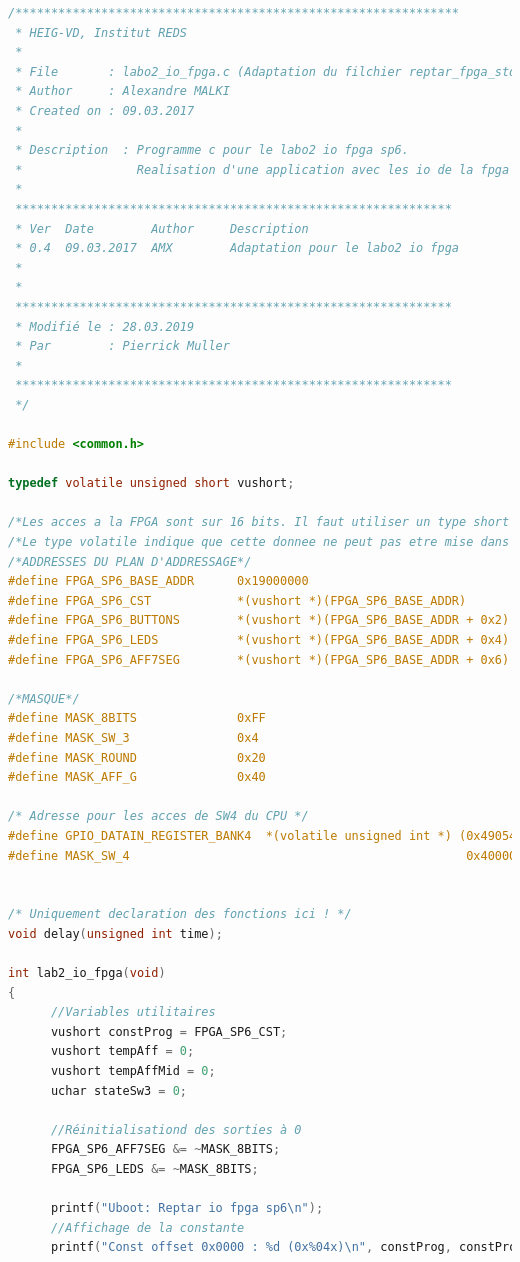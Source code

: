 \begin{lstlisting}[language=C]
/**************************************************************
 * HEIG-VD, Institut REDS
 *
 * File       : labo2_io_fpga.c (Adaptation du filchier reptar_fpga_std.c)
 * Author     : Alexandre MALKI
 * Created on : 09.03.2017
 *
 * Description  : Programme c pour le labo2 io fpga sp6.
 *                Realisation d'une application avec les io de la fpga
 *
 *************************************************************
 * Ver  Date        Author     Description
 * 0.4  09.03.2017  AMX        Adaptation pour le labo2 io fpga
 *
 *
 *************************************************************
 * Modifié le : 28.03.2019
 * Par        : Pierrick Muller
 *
 *************************************************************
 */

#include <common.h>

typedef volatile unsigned short vushort;

/*Les acces a la FPGA sont sur 16 bits. Il faut utiliser un type short */
/*Le type volatile indique que cette donnee ne peut pas etre mise dans le cash*/
/*ADDRESSES DU PLAN D'ADDRESSAGE*/
#define FPGA_SP6_BASE_ADDR      0x19000000
#define FPGA_SP6_CST            *(vushort *)(FPGA_SP6_BASE_ADDR)
#define FPGA_SP6_BUTTONS        *(vushort *)(FPGA_SP6_BASE_ADDR + 0x2)
#define FPGA_SP6_LEDS           *(vushort *)(FPGA_SP6_BASE_ADDR + 0x4)
#define FPGA_SP6_AFF7SEG        *(vushort *)(FPGA_SP6_BASE_ADDR + 0x6)

/*MASQUE*/
#define MASK_8BITS              0xFF
#define MASK_SW_3               0x4
#define MASK_ROUND              0x20
#define MASK_AFF_G              0x40

/* Adresse pour les acces de SW4 du CPU */
#define GPIO_DATAIN_REGISTER_BANK4  *(volatile unsigned int *) (0x49054038)
#define MASK_SW_4                                               0x40000000


/* Uniquement declaration des fonctions ici ! */
void delay(unsigned int time);

int lab2_io_fpga(void)
{
	  //Variables utilitaires
      vushort constProg = FPGA_SP6_CST;
      vushort tempAff = 0;
      vushort tempAffMid = 0;
      uchar stateSw3 = 0;
	  
	  //Réinitialisationd des sorties à 0
      FPGA_SP6_AFF7SEG &= ~MASK_8BITS;
      FPGA_SP6_LEDS &= ~MASK_8BITS;

      printf("Uboot: Reptar io fpga sp6\n");
	  //Affichage de la constante
      printf("Const offset 0x0000 : %d (0x%04x)\n", constProg, constProg);


\end{lstlisting}

